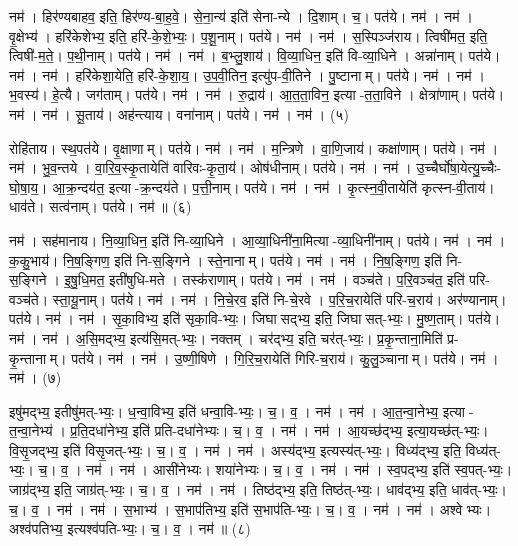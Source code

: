नम॑। हिर॑ण्यबाहव॒ इति॒ हिर॑ण्य-बा॒ह॒वे॒। से॒ना॒न्य॑ इति॑ सेना-न्ये। दि॒शाम्। च॒। पत॑ये। नम॑। 
नम॑। वृ॒क्षेभ्य॑। हरि॑केशेभ्य॒ इति॒ हरि॑-के॒शे॒भ्यः॒। प॒शू॒नाम्। पत॑ये। नम॑। 
नम॑। स॒स्पिञ्ज॑राय। त्विषी॑मत॒ इति॒ त्विषी॑-म॒ते॒। प॒थी॒नाम्। पत॑ये। नम॑। 
नम॑। ब॒भ्लु॒शाय॑। वि॒व्या॒धिन॒ इति॑ वि-व्या॒धिने। अन्ना॑नाम्। पत॑ये। नम॑। 
नम॑। हरि॑केशा॒येति॒ हरि॑-के॒शा॒य॒। उ॒प॒वी॒तिन॒ इत्यु॑प-वी॒तिने। पु॒ष्टानाम्। पत॑ये। नम॑। 
नम॑। भ॒वस्य॑। हे॒त्यै। जग॑ताम्। पत॑ये। नम॑। 
नम॑। रु॒द्राय॑। आ॒त॒ता॒विन॒ इत्या-त॒ता॒विने। क्षेत्रा॑णाम्। पत॑ये। नम॑। 
नम॑। सू॒ताय॑। अह॑न्त्याय। वना॑नाम्। पत॑ये। नम॑। 
नम॑। (५)


रोहि॑ताय। स्थ॒पत॑ये। वृ॒क्षाणाम्। पत॑ये। नम॑। 
नम॑। म॒न्त्रिणे। वा॒णि॒जाय॑। कक्षा॑णाम्। पत॑ये। नम॑। 
नम॑। भु॒व॒न्तये। वा॒रि॒व॒स्कृ॒तायेति॑ वारिवः-कृ॒ता॒य॑। ओष॑धीनाम्। पत॑ये। नम॑। 
नम॑। उ॒च्चैर्घो॑षा॒येत्यु॒च्चैः-घो॒षा॒य॒। आ॒क्र॒न्दय॑त॒ इत्या-क्र॒न्दय॑ते। प॒त्ती॒नाम्। पत॑ये। नम॑। 
नम॑। कृ॒त्स्न॒वी॒तायेति॑ कृत्स्न-वी॒ताय॑। धाव॑ते। सत्व॑नाम्। पत॑ये। नम॑॥ (६)


नम॑। सह॑मानाय। नि॒व्या॒धिन॒ इति॑ नि-व्या॒धिने। आ॒व्या॒धिनी॑ना॒मित्या-व्या॒धिनी॑नाम्। पत॑ये। नम॑। 
नम॑। क॒कु॒भाय॑। नि॒ष॒ङ्गिण॒ इति॑ नि-स॒ङ्गिने। स्ते॒नानाम्। पत॑ये। नम॑। 
नम॑। नि॒ष॒ङ्गिण॒ इति॑ नि-स॒ङ्गिने। इ॒षु॒धि॒मत॒ इती॑षुधि-मते। तस्क॑राणाम्। पत॑ये। नम॑। 
नम॑। वञ्च॑ते। प॒रि॒वञ्च॑त॒ इति॑ परि-वञ्च॑ते। स्ता॒यू॒नाम्। पत॑ये। नम॑। 
नम॑। नि॒चे॒रव॒ इति॑ नि-चे॒रवे। प॒रि॒च॒रायेति॑ परि-च॒राय॑। अर॑ण्यानाम्। पत॑ये। नम॑। 
नम॑। सृ॒का॒विभ्य॒ इति॑ सृका॒वि-भ्यः॒। जिघासद्भ्य॒ इति॒ जिघासत्-भ्यः॒। मु॒ष्ण॒ताम्। पत॑ये। नम॑। 
नम॑। अ॒सि॒मद्भ्य॒ इत्य॑सि॒मत्-भ्यः॒। नक्तम्। चर॑द्भ्य॒ इति॒ चर॑त्-भ्यः॒। प्र॒कृ॒न्ताना॒मिति॑ प्र-कृ॒न्तानाम्। पत॑ये। नम॑। 
नम॑। उ॒ष्णी॒षिणे। गि॒रि॒च॒रायेति॑ गिरि-च॒राय॑। कु॒लु॒ञ्चानाम्। पत॑ये। नम॑। नम॑। (७)


इषु॑मद्भ्य॒ इतीषु॑मत्-भ्यः॒। ध॒न्वा॒विभ्य॒ इति॑ धन्वा॒वि-भ्यः॒। च॒। व॒। नम॑। 
नम॑। आ॒त॒न्वा॒नेभ्य॒ इत्या-त॒न्वा॒नेभ्य॑। प्र॒ति॒दधा॑नेभ्य॒ इति॑ प्रति-दधा॑नेभ्यः। च॒। व॒। नम॑। 
नम॑। आ॒यच्छ॑द्भ्य॒ इत्या॒यच्छ॑त्-भ्यः॒। वि॒सृ॒जद्भ्य॒ इति॑ विसृ॒जत्-भ्यः॒। च॒। व॒। नम॑। 
नम॑। अस्य॑द्भ्य॒ इत्यस्य॑त्-भ्यः॒। विध्य॑द्भ्य॒ इति॒ विध्य॑त्-भ्यः॒। च॒। व॒। नम॑। 
नम॑। आसी॑नेभ्यः। शया॑नेभ्यः। च॒। व॒। नम॑। 
नम॑। स्व॒पद्भ्य॒ इति॑ स्व॒पत्-भ्यः॒। जाग्र॑द्भ्य॒ इति॒ जाग्र॑त्-भ्यः॒। च॒। व॒। नम॑। 
नम॑। तिष्ठ॑द्भ्य॒ इति॒ तिष्ठ॑त्-भ्यः॒। धाव॑द्भ्य॒ इति॒ धाव॑त्-भ्यः॒। च॒। व॒। नम॑। 
नम॑। स॒भाभ्य॑। स॒भाप॑तिभ्य॒ इति॑ स॒भाप॑ति-भ्यः॒। च॒। व॒। नम॑। 
नम॑। अश्वेभ्यः। अश्व॑पतिभ्य॒ इत्यश्व॑पति-भ्यः॒। च॒। व॒। नम॑॥ (८)


